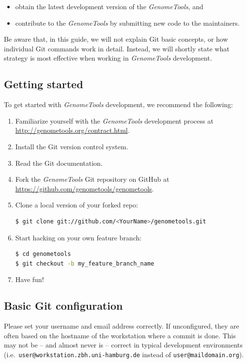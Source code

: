 \documentclass[11pt,final]{article}
\newcommand{\keyword}[1]{\lstinline{#1}}
\newcommand{\Gt}[0]{\emph{GenomeTools}\xspace}
\begin{document}
\begin{itemize}
\item
obtain the latest development version of the \Gt , and
\item
contribute to the \Gt by submitting new code to the maintainers.
\end{itemize}

Be aware that, in this guide, we will not explain Git basic concepts, or how
individual Git commands work in detail. Instead, we will shortly state what
strategy is most effective when working in \Gt development.

\subsection{Getting started}
To get started with \Gt development, we recommend the following:
\begin{enumerate}
  \item Familiarize yourself with the \Gt development process at \url{http://genometools.org/contract.html}.
  \item Install the Git version control system.
  \item Read the Git documentation.
  \item Fork the \Gt Git repository on GitHub at \url{https://github.com/genometools/genometools}.
  \item Clone a local version of your forked repo:
    \begin{lstlisting}[language=sh]
$ git clone git://github.com/<YourName>/genometools.git
    \end{lstlisting}%
  \item Start hacking on your own feature branch:
    \begin{lstlisting}[language=sh]
$ cd genometools
$ git checkout -b my_feature_branch_name
    \end{lstlisting}
 \item Have fun!
\end{enumerate}

\subsection{Basic Git configuration}

Please set your username and email address correctly. If unconfigured, they are
often based on the hostname of the workstation where a commit is done. This may
not be -- and almost never is --  correct in typical development environments
(i.e.\ \keyword{user@workstation.zbh.uni-hamburg.de} instead of
\keyword{user@maildomain.org}).
\end{document}
